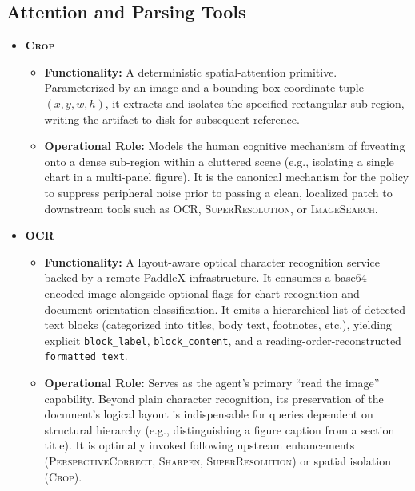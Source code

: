 \subsection*{Attention and Parsing Tools}

\begin{itemize}[leftmargin=*,itemsep=5pt]

    \item \textbf{\textsc{Crop}}
    \begin{itemize}
        \item \textbf{Functionality:} A deterministic spatial-attention primitive. Parameterized by an image and a bounding box coordinate tuple $(x, y, w, h)$, it extracts and isolates the specified rectangular sub-region, writing the artifact to disk for subsequent reference.
        \item \textbf{Operational Role:} Models the human cognitive mechanism of foveating onto a dense sub-region within a cluttered scene (e.g., isolating a single chart in a multi-panel figure). It is the canonical mechanism for the policy to suppress peripheral noise prior to passing a clean, localized patch to downstream tools such as \textsc{OCR}, \textsc{SuperResolution}, or \textsc{ImageSearch}.
    \end{itemize}

    \item \textbf{\textsc{OCR}}
    \begin{itemize}
        \item \textbf{Functionality:} A layout-aware optical character recognition service backed by a remote PaddleX infrastructure. It consumes a base64-encoded image alongside optional flags for chart-recognition and document-orientation classification. It emits a hierarchical list of detected text blocks (categorized into titles, body text, footnotes, etc.), yielding explicit \texttt{block\_label}, \texttt{block\_content}, and a reading-order-reconstructed \texttt{formatted\_text}.
        \item \textbf{Operational Role:} Serves as the agent's primary ``read the image'' capability. Beyond plain character recognition, its preservation of the document's logical layout is indispensable for queries dependent on structural hierarchy (e.g., distinguishing a figure caption from a section title). It is optimally invoked following upstream enhancements (\textsc{PerspectiveCorrect}, \textsc{Sharpen}, \textsc{SuperResolution}) or spatial isolation (\textsc{Crop}).
    \end{itemize}

\end{itemize}

